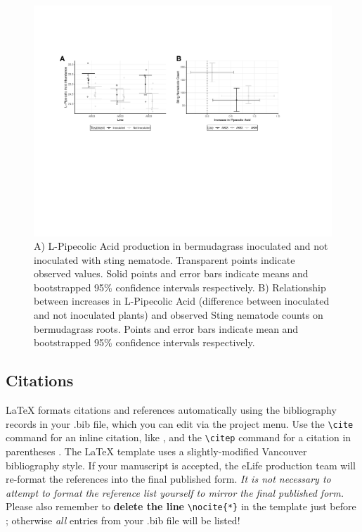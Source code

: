 \documentclass[9pt,lineno]{elife}
\begin{document}
\begin{figure}
\includegraphics[width = 0.95\linewidth]{figures/publication_figures/figure-6.pdf}
\caption{A) L-Pipecolic Acid production in bermudagrass inoculated and not inoculated with sting nematode.  Transparent points indicate observed values.  Solid points and error bars indicate means and bootstrapped 95\% confidence intervals respectively.  B) Relationship between increases in L-Pipecolic Acid (difference between inoculated and not inoculated plants) and observed Sting nematode counts on bermudagrass roots.  Points and error bars indicate mean and bootstrapped 95\% confidence intervals respectively.   }
\label{fig:figure6}
\end{figure}






\subsection{Citations}

LaTeX formats citations and references automatically using the bibliography records in your .bib file, which you can edit via the project menu. Use the \verb|\cite| command for an inline citation, like \cite{Aivazian917}, and the \verb|\citep| command for a citation in parentheses \citep{Aivazian917}. The LaTeX template uses a slightly-modified Vancouver bibliography style. If your manuscript is accepted, the eLife production team will re-format the references into the final published form. \emph{It is not necessary to attempt to format the reference list yourself to mirror the final published form.} Please also remember to \textbf{delete the line} \verb|\nocite{*}| in the template just before \verb||; otherwise \emph{all} entries from your .bib file will be listed! 
\end{document}
